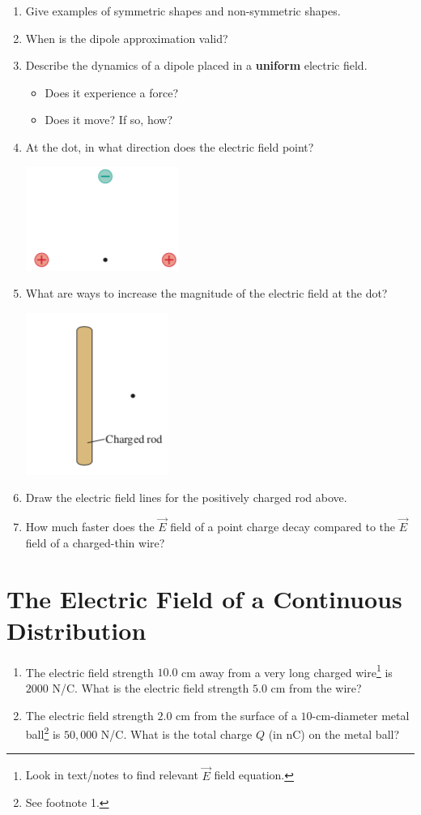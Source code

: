 \documentclass{article}
\begin{document}
\begin{enumerate}[label=(\alph*)]
\item Give examples of symmetric shapes and non-symmetric shapes.
\item When is the dipole approximation valid?
\item Describe the dynamics of a dipole placed in a \textbf{uniform} electric field.
\begin{itemize}
	\item Does it experience a force?
	\item Does it move? If so, how?
\end{itemize}
\item At the dot, in what direction does the electric field point?
 
\includegraphics[width=.2\linewidth]{W2a_Fig1.png}
\item What are ways to increase the magnitude of the electric field at the dot?

\includegraphics[width=.2\linewidth]{W2a_Fig2}
\item Draw the electric field lines for the positively charged rod above.
\item How much faster does the $\vec{E}$ field of a point charge decay compared to the $\vec{E}$ field of a charged-thin wire?
\end{enumerate}

\section{The Electric Field of a Continuous Distribution}

\begin{enumerate}[label=(\alph*)]
	\item The electric field strength $10.0$ cm away from a very long charged wire\footnote{\label{text}Look in text/notes to find relevant $\vec{E}$ field equation.} is $2000$ N/C. What is the electric field strength $5.0$ cm from the wire?
	
	\item The electric field strength $2.0$ cm from the surface of a $10$-cm-diameter metal ball\footnote{See footnote 1.} is $50,000$ N/C. What is the total  charge $Q$ (in nC) on the metal ball?
\end{enumerate}
\end{document}
